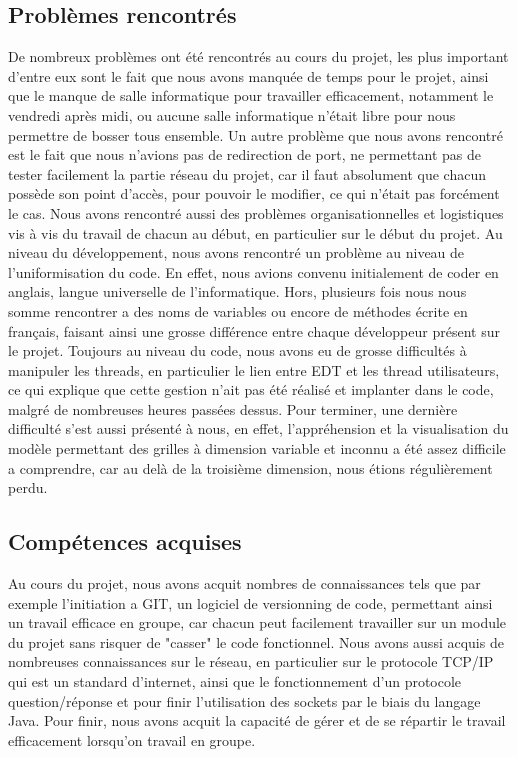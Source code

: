 \subsection{Problèmes rencontrés}
	De nombreux problèmes ont été rencontrés au cours du projet, les plus important d'entre eux sont le fait que nous avons manquée de temps pour le projet, ainsi que le manque de salle informatique pour travailler efficacement, notamment le vendredi après midi, ou aucune salle informatique n'était libre pour nous permettre de bosser tous ensemble.\newline
	Un autre problème que nous avons rencontré est le fait que nous n'avions pas de redirection de port, ne permettant pas de tester facilement la partie réseau du projet, car il faut absolument que chacun possède son point d'accès, pour pouvoir le modifier, ce qui n'était pas forcément le cas.\newline
	Nous avons rencontré aussi des problèmes organisationnelles et logistiques vis à vis du travail de chacun au début, en particulier sur le début du projet.\newline
	Au niveau du développement, nous avons rencontré un problème au niveau de l'uniformisation du code. En effet, nous avions convenu initialement de coder en anglais, langue universelle de l'informatique. Hors, plusieurs fois nous nous somme rencontrer a des noms de variables ou encore de méthodes écrite en français, faisant ainsi une grosse différence entre chaque développeur présent sur le projet.\newline
	Toujours au niveau du code, nous avons eu de grosse difficultés à manipuler les threads, en particulier le lien entre EDT et les thread utilisateurs, ce qui explique que cette gestion n'ait pas été réalisé et implanter dans le code, malgré de nombreuses heures passées dessus.\newline
	Pour terminer, une dernière difficulté s'est aussi présenté à nous, en effet, l'appréhension et la visualisation du modèle permettant des grilles à dimension variable et inconnu a été assez difficile a comprendre, car au delà de la troisième dimension, nous étions régulièrement perdu.

\subsection{Compétences acquises}
	Au cours du projet, nous avons acquit nombres de connaissances tels que par exemple l'initiation a GIT, un logiciel de versionning de code, permettant ainsi un travail efficace en groupe, car chacun peut facilement travailler sur un module du projet sans risquer de "casser" le code fonctionnel.\newline
	 Nous avons aussi acquis de nombreuses connaissances sur le réseau, en particulier sur le protocole TCP/IP qui est un standard d'internet, ainsi que le fonctionnement d'un protocole question/réponse et pour finir l'utilisation des sockets par le biais du langage Java.\newline
	 Pour finir, nous avons acquit la capacité de gérer et de se répartir le travail efficacement lorsqu'on travail en groupe.
